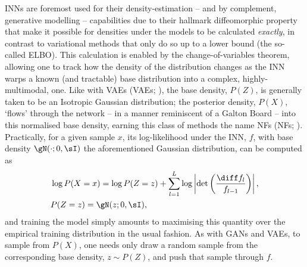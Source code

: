 \acp{INN} are foremost used for their density-estimation -- and by complement, generative modelling
-- capabilities due to their hallmark diffeomorphic property that make it possible for densities
under the models to be calculated \emph{exactly}, in contrast to variational methods that only do
so up to a lower bound (the so-called \ac{ELBO}). 
%
%
This calculation is enabled by the change-of-variables theorem, allowing one to track how the
density of the distribution changes as the INN warps a known (and tractable) base distribution into
a complex, highly-multimodal, one.
%
Like with \aclp{VAE} (\acsp{VAE}; \citealp{kingma2014auto}), the base density, \(P(Z)\), is generally
taken to be an Isotropic Gaussian distribution; the posterior density, \(P(X)\), `flows' through
the network -- in a manner reminiscent of a Galton Board -- into this normalised base density,
earning this class of methods the name \aclp{NF} (\acsp{NF}; \citealp{rezende2015variational,
kobyzev2020normalizing}).
%
Practically, for a given sample \(x\), its log-likelihood under the \ac{INN}, \(f\), with base
density \(\gN(\cdot; 0, \sI)\) the aforementioned Gaussian distribution, can be computed as
%
\begin{equation*}
%
    \begin{aligned}
        &\log P(X=x) = 
        \log P(Z=z) + \sum_{l=1}^L \log \left| \det\left( \frac{\diff f_l}{ f_{l-1}}\right)
        \right|, \\
        &P(Z=z) = \gN(z; 0, \sI),
    \end{aligned}
\label{eq:cov}
%
\end{equation*}
%
and training the model simply amounts to maximising this quantity over the empirical training
distribution in the usual fashion.
%
As with \acp{GAN} and \acp{VAE}, to sample from \(P(X)\), one needs only draw a random sample from
the corresponding base density, \(z \sim P(Z) \), and push that sample through \(f\).


